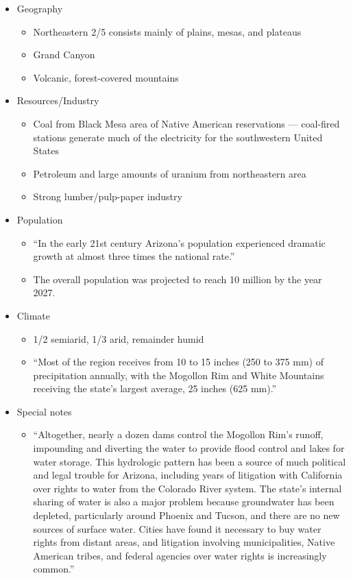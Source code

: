 \documentclass[9pt,twocolumn,twoside]{pnas-new}
\begin{document}
\begin{itemize}
\item Geography
\begin{itemize}
\item Northeastern 2/5 consists mainly of plains, mesas, and plateaus
\item Grand Canyon
\item Volcanic, forest-covered mountains 
\end{itemize}
\item Resources/Industry
\begin{itemize}
\item Coal from Black Mesa area of Native American reservations — coal-fired stations generate much of the electricity for the southwestern United States
\item Petroleum and large amounts of uranium from northeastern area
\item Strong lumber/pulp-paper industry
\end{itemize}
\item Population
\begin{itemize}
\item  “In the early 21st century Arizona’s population experienced dramatic growth at almost three times the national rate.”
\item The overall population was projected to reach 10 million by the year 2027.
\end{itemize}
\item Climate
\begin{itemize}
\item 1/2 semiarid, 1/3 arid, remainder humid
\item “Most of the region receives from 10 to 15 inches (250 to 375 mm) of precipitation annually, with the Mogollon Rim and White Mountains receiving the state’s largest average, 25 inches (625 mm).”
\end{itemize}
\item Special notes
\begin{itemize}
\item “Altogether, nearly a dozen dams control the Mogollon Rim’s runoff, impounding and diverting the water to provide flood control and lakes for water storage. This hydrologic pattern has been a source of much political and legal trouble for Arizona, including years of litigation with California over rights to water from the Colorado River system. The state’s internal sharing of water is also a major problem because groundwater has been depleted, particularly around Phoenix and Tucson, and there are no new sources of surface water. Cities have found it necessary to buy water rights from distant areas, and litigation involving municipalities, Native American tribes, and federal agencies over water rights is increasingly common.”
\end{itemize}

\end{itemize}
\end{document}
